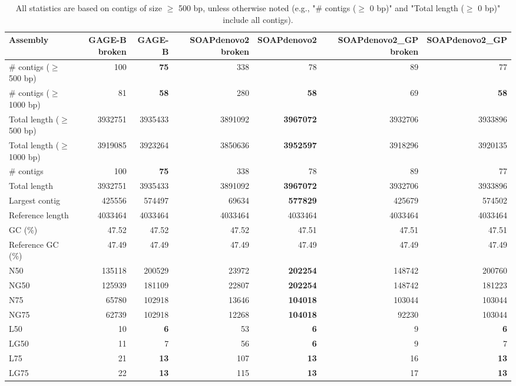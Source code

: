 \documentclass[12pt,a4paper]{article}
\begin{document}
\begin{table}[ht]
\begin{center}
\caption{All statistics are based on contigs of size $\geq$ 500 bp, unless otherwise noted (e.g., "\# contigs ($\geq$ 0 bp)" and "Total length ($\geq$ 0 bp)" include all contigs).}
\begin{tabular}{|l*{6}{|r}|}
\hline
Assembly & GAGE-B broken & GAGE-B & SOAPdenovo2 broken & SOAPdenovo2 & SOAPdenovo2\_GP broken & SOAPdenovo2\_GP \\ \hline
\# contigs ($\geq$ 500 bp) & 100 & {\bf 75} & 338 & 78 & 89 & 77 \\ \hline
\# contigs ($\geq$ 1000 bp) & 81 & {\bf 58} & 280 & {\bf 58} & 69 & {\bf 58} \\ \hline
Total length ($\geq$ 500 bp) & 3932751 & 3935433 & 3891092 & {\bf 3967072} & 3932706 & 3933896 \\ \hline
Total length ($\geq$ 1000 bp) & 3919085 & 3923264 & 3850636 & {\bf 3952597} & 3918296 & 3920135 \\ \hline
\# contigs & 100 & {\bf 75} & 338 & 78 & 89 & 77 \\ \hline
Total length & 3932751 & 3935433 & 3891092 & {\bf 3967072} & 3932706 & 3933896 \\ \hline
Largest contig & 425556 & 574497 & 69634 & {\bf 577829} & 425679 & 574502 \\ \hline
Reference length & 4033464 & 4033464 & 4033464 & 4033464 & 4033464 & 4033464 \\ \hline
GC (\%) & 47.52 & 47.52 & 47.52 & 47.51 & 47.51 & 47.51 \\ \hline
Reference GC (\%) & 47.49 & 47.49 & 47.49 & 47.49 & 47.49 & 47.49 \\ \hline
N50 & 135118 & 200529 & 23972 & {\bf 202254} & 148742 & 200760 \\ \hline
NG50 & 125939 & 181109 & 22807 & {\bf 202254} & 148742 & 181223 \\ \hline
N75 & 65780 & 102918 & 13646 & {\bf 104018} & 103044 & 103044 \\ \hline
NG75 & 62739 & 102918 & 12268 & {\bf 104018} & 92230 & 103044 \\ \hline
L50 & 10 & {\bf 6} & 53 & {\bf 6} & 9 & {\bf 6} \\ \hline
LG50 & 11 & 7 & 56 & {\bf 6} & 9 & 7 \\ \hline
L75 & 21 & {\bf 13} & 107 & {\bf 13} & 16 & {\bf 13} \\ \hline
LG75 & 22 & {\bf 13} & 115 & {\bf 13} & 17 & {\bf 13} \\ \hline

\end{tabular}
\end{center}
\end{table}
\end{document}
